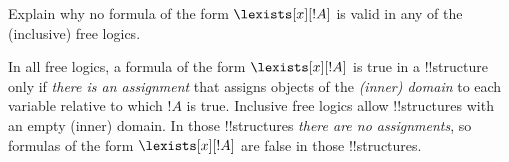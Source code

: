 \documentclass[../../../include/open-logic-section]{subfiles}
\begin{document}
\begin{prob}[Existence]
Explain why no formula of the form $\lexists[x][!A]$ is valid in any
of the (inclusive) free logics. 
\begin{ans}
In all free logics, a formula of the form $\lexists[x][!A]$ is true in
a !!{structure} only if \emph{there is an assignment} that assigns
objects of the \emph{(inner) domain} to each variable relative to
which $!A$ is true. Inclusive free logics allow !!{structure}s with an
empty (inner) domain. In those !!{structure}s \emph{there are no
assignments}, so formulas of the form $\lexists[x][!A]$ are false in
those !!{structure}s. 

\end{ans}
\end{prob}
\end{document}
